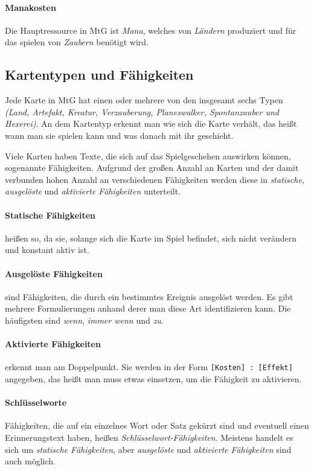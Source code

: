 \paragraph{Manakosten}
Die Hauptressource in \ac{MtG} ist \emph{Mana}, welches von \emph{Ländern} produziert und für das spielen von \emph{Zaubern} benötigt wird. \cite{rulebook:2013}

\subsection{Kartentypen und Fähigkeiten}
Jede Karte in \ac{MtG} hat einen oder mehrere von den insgesamt sechs Typen \emph{(Land, Artefakt, Kreatur, Verzauberung, Planeswalker, Spontanzauber und Hexerei)}. An dem Kartentyp erkennt man wie sich die Karte verhält, das heißt wann man sie spielen kann und was danach mit ihr geschieht. \cite{rulebook:2013}

Viele Karten haben Texte, die sich auf das Spielgeschehen auswirken können, sogenannte Fähigkeiten. Aufgrund der großen Anzahl an Karten und der damit verbunden hohen Anzahl an verschiedenen Fähigkeiten werden diese in \emph{statische}, \emph{ausgelöste} und \emph{aktivierte Fähigkeiten} unterteilt. \cite{rulebook:2013}

\paragraph{Statische Fähigkeiten}
heißen so, da sie, solange sich die Karte im Spiel befindet, sich nicht verändern und konstant aktiv ist.

\paragraph{Ausgelöste Fähigkeiten}
sind Fähigkeiten, die durch ein bestimmtes Ereignis ausgelöst werden. Es gibt mehrere Formulierungen anhand derer man diese Art identifizieren kann. Die häufigsten sind \emph{wenn}, \emph{immer wenn} und \emph{zu}.

\paragraph{Aktivierte Fähigkeiten}
 erkennt man am Doppelpunkt. Sie werden in der Form \verb|[Kosten] : [Effekt]| angegeben, das heißt man muss etwas einsetzen, um die Fähigkeit zu aktivieren.

\paragraph{Schlüsselworte}
Fähigkeiten, die auf ein einzelnes Wort oder Satz gekürzt sind und eventuell einen Erinnerungstext haben, heißen \emph{Schlüsselwort-Fähigkeiten}. Meistens handelt es sich um \emph{statische Fähigkeiten}, aber \emph{ausgelöste} und \emph{aktivierte Fähigkeiten} sind auch möglich.


